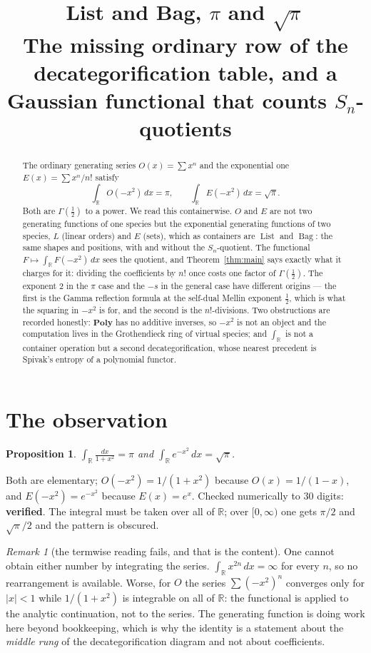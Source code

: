 \documentclass[11pt,a4paper]{article}
\title{\bfseries List and Bag, $\pi$ and $\sqrt{\pi}$\\[0.4em]
\large The missing ordinary row of the decategorification table,
and a Gaussian functional that counts $S_n$-quotients}
\author{}
\date{}
\newtheorem{proposition}[theorem]{Proposition}
\theoremstyle{definition}
\theoremstyle{remark}
\newtheorem{remark}[theorem]{Remark}
\newcommand{\RR}{\mathbb{R}}
\newcommand{\cat}[1]{\mathbf{#1}}
\newcommand{\Poly}{\cat{Poly}}
\newcommand{\norm}[1]{\lvert #1 \rvert}
\DeclareMathOperator{\Bag}{Bag}
\DeclareMathOperator{\List}{List}
\newcommand{\OK}{\textcolor{okgreen}{\textbf{verified}}}
\begin{document}
\maketitle

\begin{abstract}
The ordinary generating series $O(x) = \sum x^n$ and the exponential one
$E(x) = \sum x^n/n!$ satisfy
\[
  \int_{\RR} O(-x^2)\,dx = \pi,
  \qquad
  \int_{\RR} E(-x^2)\,dx = \sqrt{\pi}.
\]
Both are $\Gamma(\tfrac12)$ to a power. We read this containerwise. $O$ and $E$ are
not two generating functions of one species but the exponential generating functions
of two species, $L$ (linear orders) and $E$ (sets), which as containers are
$\List$ and $\Bag$: the same shapes and positions, with and without the
$S_n$-quotient. The functional $F \mapsto \int_{\RR} F(-x^2)\,dx$ sees the quotient,
and Theorem~\ref{thm:main} says exactly what it charges for it: dividing the
coefficients by $n!$ once costs one factor of $\Gamma(\tfrac12)$. The exponent $2$
in the $\pi$ case and the $-s$ in the general case have different origins --- the
first is the Gamma reflection formula at the self-dual Mellin exponent $\tfrac12$,
which is what the squaring in $-x^2$ is for, and the second is the $n!$-divisions.
Two obstructions are recorded honestly: $\Poly$ has no additive inverses, so $-x^2$
is not an object and the computation lives in the Grothendieck ring of virtual
species; and $\int_\RR$ is not a container operation but a second decategorification,
whose nearest precedent is Spivak's entropy of a polynomial functor.
\end{abstract}

\section{The observation}

\begin{proposition}\label{prop:obs}
$\displaystyle\int_{\RR}\frac{dx}{1+x^2} = \pi$ and
$\displaystyle\int_{\RR} e^{-x^2}\,dx = \sqrt{\pi}$.
\end{proposition}

Both are elementary; $O(-x^2) = 1/(1+x^2)$ because $O(x) = 1/(1-x)$, and
$E(-x^2) = e^{-x^2}$ because $E(x) = e^x$. Checked numerically to $30$ digits:
\OK. The integral must be taken over all of $\RR$; over $[0,\infty)$ one gets
$\pi/2$ and $\sqrt{\pi}/2$ and the pattern is obscured.

\begin{remark}[the termwise reading fails, and that is the content]\label{rem:termwise}
One cannot obtain either number by integrating the series. $\int_\RR x^{2n}\,dx = \infty$
for every $n$, so no rearrangement is available. Worse, for $O$ the series
$\sum (-x^2)^n$ converges only for $\norm{x} < 1$ while $1/(1+x^2)$ is integrable on
all of $\RR$: the functional is applied to the analytic continuation, not to the series.
The generating function is doing work here beyond bookkeeping, which is why the
identity is a statement about the \emph{middle rung} of the decategorification
diagram and not about coefficients.
\end{remark}
\end{document}
